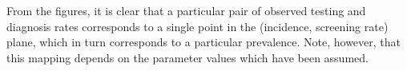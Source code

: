 \documentclass{article}
\begin{document}
    From the figures, it is clear that a particular pair of observed testing
and diagnosis rates corresponds to a single point in the (incidence,
screening rate) plane, which in turn corresponds to a particular
prevalence. Note, however, that this mapping depends on the parameter
values which have been assumed.


    
    
    
    
\end{document}
